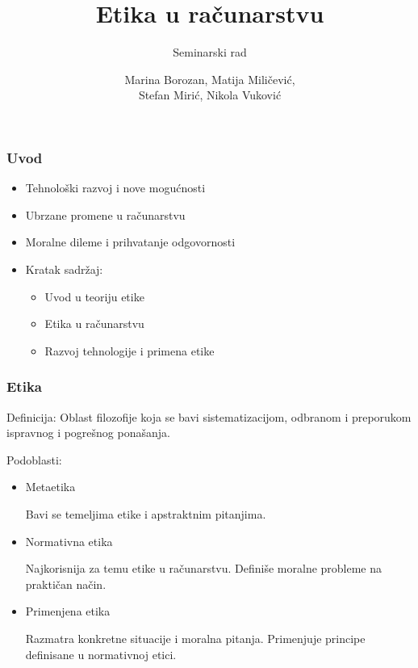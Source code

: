 \documentclass[pdf]{beamer}
\title{Etika u računarstvu}
\subtitle{Seminarski rad}%
\author[]{Marina Borozan, Matija Miličević,\\
	Stefan Mirić, Nikola Vuković\\}
\begin{document}
\begin{frame}
	\titlepage
	\end{frame}


\begin{frame}
\frametitle{Uvod}

\begin{itemize}
\item{Tehnološki razvoj i nove mogućnosti}
\item{Ubrzane promene u računarstvu}
\item{Moralne dileme i prihvatanje odgovornosti}
\item{Kratak sadržaj:}
	\begin{itemize}
	\item{Uvod u teoriju etike}
	\item{Etika u računarstvu}
	\item{Razvoj tehnologije i primena etike}
	\end{itemize}
\end{itemize}

\end{frame}

\begin{frame}
\frametitle{Etika}

Definicija: Oblast filozofije koja se bavi sistematizacijom, odbranom i preporukom ispravnog i pogrešnog ponašanja.

Podoblasti:
\begin{itemize}
\item{Metaetika

	Bavi se temeljima etike i apstraktnim pitanjima.}
\item{Normativna etika

	Najkorisnija za temu etike u računarstvu. Definiše moralne probleme na praktičan način.}
\item{Primenjena etika
	
	Razmatra konkretne situacije i moralna pitanja. Primenjuje principe definisane u normativnoj etici.}
\end{itemize}

\end{frame}
\end{document}
